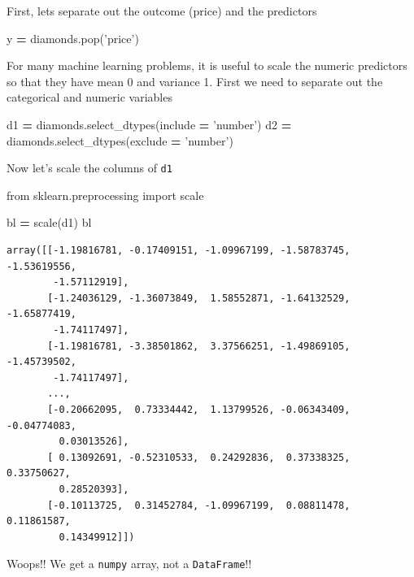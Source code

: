 \documentclass[
  letterpaper,
]{scrbook}
\newenvironment{Shaded}{\begin{snugshade}}{\end{snugshade}}
\newcommand{\ImportTok}[1]{#1}
\newcommand{\NormalTok}[1]{#1}
\newcommand{\OperatorTok}[1]{\textcolor[rgb]{0.81,0.36,0.00}{\textbf{#1}}}
\newcommand{\StringTok}[1]{\textcolor[rgb]{0.31,0.60,0.02}{#1}}
\begin{document}
First, lets separate out the outcome (price) and the predictors

\begin{Shaded}
\begin{Highlighting}[]
\NormalTok{y }\OperatorTok{=}\NormalTok{ diamonds.pop(}\StringTok{'price'}\NormalTok{)}
\end{Highlighting}
\end{Shaded}

For many machine learning problems, it is useful to scale the numeric predictors so that they have mean 0 and
variance 1. First we need to separate out the categorical and numeric variables

\begin{Shaded}
\begin{Highlighting}[]
\NormalTok{d1 }\OperatorTok{=}\NormalTok{ diamonds.select_dtypes(include }\OperatorTok{=} \StringTok{'number'}\NormalTok{)}
\NormalTok{d2 }\OperatorTok{=}\NormalTok{ diamonds.select_dtypes(exclude }\OperatorTok{=} \StringTok{'number'}\NormalTok{)}
\end{Highlighting}
\end{Shaded}

Now let's scale the columns of \texttt{d1}

\begin{Shaded}
\begin{Highlighting}[]
\ImportTok{from}\NormalTok{ sklearn.preprocessing }\ImportTok{import}\NormalTok{ scale}

\NormalTok{bl }\OperatorTok{=}\NormalTok{ scale(d1)}
\NormalTok{bl}
\end{Highlighting}
\end{Shaded}

\begin{verbatim}
array([[-1.19816781, -0.17409151, -1.09967199, -1.58783745, -1.53619556,
        -1.57112919],
       [-1.24036129, -1.36073849,  1.58552871, -1.64132529, -1.65877419,
        -1.74117497],
       [-1.19816781, -3.38501862,  3.37566251, -1.49869105, -1.45739502,
        -1.74117497],
       ...,
       [-0.20662095,  0.73334442,  1.13799526, -0.06343409, -0.04774083,
         0.03013526],
       [ 0.13092691, -0.52310533,  0.24292836,  0.37338325,  0.33750627,
         0.28520393],
       [-0.10113725,  0.31452784, -1.09967199,  0.08811478,  0.11861587,
         0.14349912]])
\end{verbatim}

Woops!! We get a \texttt{numpy} array, not a \texttt{DataFrame}!!
\end{document}
